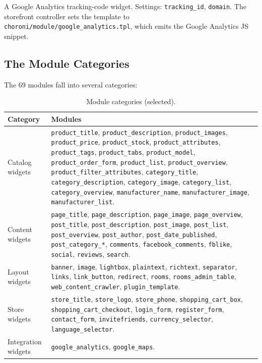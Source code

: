 \documentclass[11pt,a4paper]{article}
\begin{document}
A Google Analytics tracking-code widget. Settings:
\texttt{tracking\_id}, \texttt{domain}. The storefront controller
sets the template to
\texttt{choroni/module/google\_analytics.tpl}, which emits the
Google Analytics JS snippet.

\subsection{The Module Categories}

The 69 modules fall into several categories:

\begin{table}[htbp]
\centering
\caption{Module categories (selected).}\label{tab:module-categories}
\footnotesize\sloppy
\begin{tabularx}{\columnwidth}{lX}
\toprule
\textbf{Category} & \textbf{Modules} \\
\midrule
Catalog widgets    & \texttt{product\_title}, \texttt{product\_description}, \texttt{product\_images}, \texttt{product\_price}, \texttt{product\_stock}, \texttt{product\_attributes}, \texttt{product\_tags}, \texttt{product\_tabs}, \texttt{product\_model}, \texttt{product\_order\_form}, \texttt{product\_list}, \texttt{product\_overview}, \texttt{product\_filter\_attributes}, \texttt{category\_title}, \texttt{category\_description}, \texttt{category\_image}, \texttt{category\_list}, \texttt{category\_overview}, \texttt{manufacturer\_name}, \texttt{manufacturer\_image}, \texttt{manufacturer\_list}. \\
Content widgets    & \texttt{page\_title}, \texttt{page\_description}, \texttt{page\_image}, \texttt{page\_overview}, \texttt{post\_title}, \texttt{post\_description}, \texttt{post\_image}, \texttt{post\_list}, \texttt{post\_overview}, \texttt{post\_author}, \texttt{post\_date\_published}, \texttt{post\_category\_*}, \texttt{comments}, \texttt{facebook\_comments}, \texttt{fblike}, \texttt{social}, \texttt{reviews}, \texttt{search}. \\
Layout widgets     & \texttt{banner}, \texttt{image}, \texttt{lightbox}, \texttt{plaintext}, \texttt{richtext}, \texttt{separator}, \texttt{links}, \texttt{link\_button}, \texttt{redirect}, \texttt{rooms}, \texttt{rooms\_admin\_table}, \texttt{web\_content\_crawler}, \texttt{plugin\_template}. \\
Store widgets      & \texttt{store\_title}, \texttt{store\_logo}, \texttt{store\_phone}, \texttt{shopping\_cart\_box}, \texttt{shopping\_cart\_checkout}, \texttt{login\_form}, \texttt{register\_form}, \texttt{contact\_form}, \texttt{invitefriends}, \texttt{currency\_selector}, \texttt{language\_selector}. \\
Integration widgets & \texttt{google\_analytics}, \texttt{google\_maps}. \\
\bottomrule
\end{tabularx}
\end{table}
\end{document}
